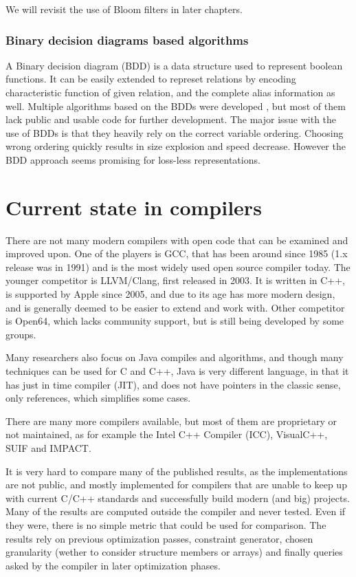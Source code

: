 We will revisit the use of Bloom filters in later chapters.

\subsubsection{Binary decision diagrams based algorithms}

A Binary decision diagram (BDD) is a data structure used to represent boolean
functions. It can be easily extended to represet relations by encoding
characteristic function of given relation, and the complete alias information as
well. Multiple algorithms based on the BDDs were developed \cite{whaley2004,bddbddb}, but most of them lack public and usable code for further
development. The major issue with the use of BDDs is that they heavily rely on
the correct variable ordering. Choosing wrong ordering quickly results in
size explosion and speed decrease. However the BDD approach seems promising for
loss-less representations.

\section{Current state in compilers}

There are not many modern compilers with open code that can be examined and improved
upon. One of the players is GCC, that has been around since 1985
(1.x release was in 1991) and is the most widely used open source compiler
today. The younger competitor is LLVM/Clang, first released in 2003. It is
written in C++, is supported by Apple since 2005, and due to its age has 
more modern design, and is generally deemed to be easier to extend and work
with. Other competitor is Open64, which lacks community support, but is still
being developed by some groups.

Many researchers also focus on Java compiles and algorithms, and though many
techniques can be used for C and C++, Java is very different language, in that
it has just in time compiler (JIT), and does not have pointers in the
classic sense, only references, which simplifies some cases.

There are many more compilers available, but most of them are proprietary or not
maintained, as for example the Intel C++ Compiler (ICC), VisualC++, SUIF and
IMPACT.

It is very hard to compare many of the published results, as the
implementations are not public, and mostly implemented for compilers that are
unable to keep up with current C/C++ standards and successfully build modern
(and big) projects. Many of the results are computed outside the compiler and
never tested. Even if they were, there is no simple metric that could be
used for comparison. The results rely on previous optimization passes,
constraint generator, chosen granularity (wether to consider structure members or
arrays) and finally queries asked by the compiler in later optimization phases.

